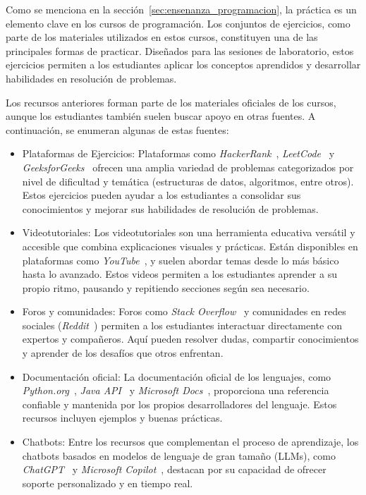 Como se menciona en la sección~\ref{sec:ensenanza_programacion}, la práctica es un elemento clave en los cursos de programación. Los conjuntos de ejercicios, como parte de los materiales utilizados en estos cursos, constituyen una de las principales formas de practicar. Diseñados para las sesiones de laboratorio, estos ejercicios permiten a los estudiantes aplicar los conceptos aprendidos y desarrollar habilidades en resolución de problemas.

Los recursos anteriores forman parte de los materiales oficiales de los cursos, aunque los estudiantes también suelen buscar apoyo en otras fuentes. A continuación, se enumeran algunas de estas fuentes:

\begin{itemize}
    \item Plataformas de Ejercicios: 
    Plataformas como \textit{HackerRank}~\cite{hackerrank}, \textit{LeetCode}~\cite{leetcode}  y \textit{GeeksforGeeks}~\cite{geeksforgeeks} ofrecen una amplia variedad de problemas categorizados por nivel de dificultad y temática (estructuras de datos, algoritmos, entre otros). Estos ejercicios pueden ayudar a los estudiantes a consolidar sus conocimientos y mejorar sus habilidades de resolución de problemas.

    \item Videotutoriales:
    Los videotutoriales son una herramienta educativa versátil y accesible que combina explicaciones visuales y prácticas. Están disponibles en plataformas como \textit{YouTube}~\cite{youtube}, y suelen abordar temas desde lo más básico hasta lo avanzado. Estos videos permiten a los estudiantes aprender a su propio ritmo, pausando y repitiendo secciones según sea necesario.

    \item Foros y comunidades: 
    Foros como \textit{Stack Overflow}~\cite{stackoverflow} y comunidades en redes sociales (\textit{Reddit}~\cite{reddit}) permiten a los estudiantes interactuar directamente con expertos y compañeros. Aquí pueden resolver dudas, compartir conocimientos y aprender de los desafíos que otros enfrentan.
    
    \item Documentación oficial:
    La documentación oficial de los lenguajes, como \textit{Python.org}~\cite{python}, \textit{Java API}~\cite{java-api} y \textit{Microsoft Docs}~\cite{microsoft-docs}, proporciona una referencia confiable y mantenida por los propios desarrolladores del lenguaje. Estos recursos incluyen ejemplos y buenas prácticas.
    
    \item Chatbots: 
    Entre los recursos que complementan el proceso de aprendizaje, los chatbots basados en modelos de lenguaje de gran tamaño (LLMs), como \textit{ChatGPT}~\cite{chatgpt} y \textit{Microsoft Copilot}~\cite{copilot}, destacan por su capacidad de ofrecer soporte personalizado y en tiempo real.
\end{itemize}


